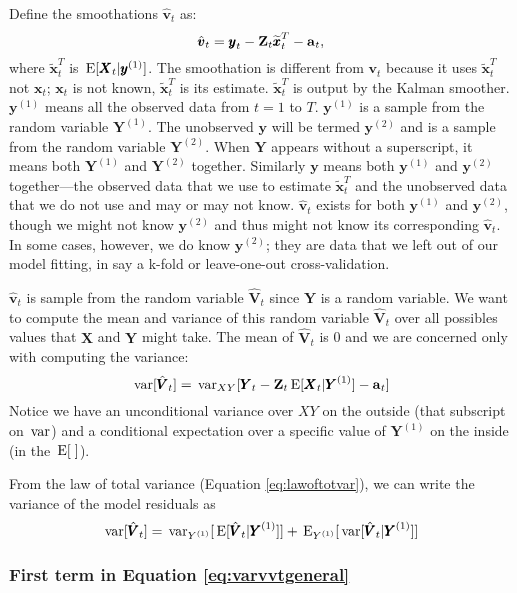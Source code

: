 \documentclass[]{article}
\def\XI{\mbox{\boldmath $\Xi$}}
\def\E{\,\textup{\textrm{E}}}
\def\VV{\mbox{$\pmb{V}$}}	\def\vv{\mbox{$\pmb{v}$}}
\def\XX{\mbox{$\pmb{X}$}}	\def\xx{\mbox{$\pmb{x}$}}
\def\YY{\mbox{$\pmb{Y}$}}	\def\yy{\mbox{$\pmb{y}$}}
\def\ZZ{\mbox{$\mathbf Z$}}	\def\zz{\mbox{$\mathbf z$}}	\def\Zb{\mbox{$\mathbf M$}} \def\Za{\mbox{$\mathbf N$}} \def\Zm{\XI}
\def\var{\,\textup{\textrm{var}}}
\def\hatxt{\widetilde{\xx}_t^T}
\begin{document}
Define the smoothations $\hat{\vv}_t$ as:
\begin{equation}\label{eq:vtT}
\hat{\vv}_t = \yy_t - \ZZ_t\hatxt - \aa_t,
\end{equation}
where  $\hatxt$ is $\E[\XX_t|\yy^{(1)}]$. The smoothation is different from $\vv_t$ because it uses $\hatxt$ not $\xx_t$; $\xx_t$ is not known, $\hatxt$ is its estimate. $\hatxt$ is output by the Kalman smoother. $\yy^{(1)}$ means all the observed data from $t=1$ to $T$. $\yy^{(1)}$ is a sample from the random variable $\YY^{(1)}$. The unobserved $\yy$ will be termed $\yy^{(2)}$ and is a sample from the random variable $\YY^{(2)}$. When $\YY$ appears without a superscript, it means both $\YY^{(1)}$ and $\YY^{(2)}$ together. Similarly $\yy$ means both $\yy^{(1)}$ and $\yy^{(2)}$ together---the observed data that we use to estimate $\hatxt$ and the unobserved data that we do not use and may or may not know. $\hat{\vv}_t$ exists for both $\yy^{(1)}$ and $\yy^{(2)}$, though we might not know $\yy^{(2)}$ and thus might not know its corresponding $\hat{\vv}_t$. In some cases, however, we do know $\yy^{(2)}$; they are data that we left out of our model fitting, in say a k-fold or leave-one-out cross-validation.

$\hat{\vv}_t$ is sample from the random variable $\hat{\VV}_t$ since $\YY$ is a random variable.  We want to compute the mean and variance of this random variable $\hat{\VV}_t$ over all possibles values that $\XX$ and $\YY$ might take. The mean of $\hat{\VV}_t$ is 0 and we are concerned only with computing the variance:
\begin{equation}\label{eq:var.vtT}
\var[\hat{\VV}_t] = \var_{XY}[\YY_t - \ZZ_t\E[\XX_t|\YY^{(1)}] - \aa_t]
\end{equation}
Notice we have an unconditional variance over $XY$ on the outside (that subscript on $\var$) and a conditional expectation over a specific value of $\YY^{(1)}$ on the inside (in the $\E[\;]$).

From the law of total variance (Equation \ref{eq:lawoftotvar}), we can write the variance of the model residuals as
\begin{equation}\label{eq:varvvtgeneral}
\var[\hat{\VV}_t] = \var_{Y^{(1)}}[\E[\hat{\VV}_t|\YY^{(1)}]] + \E_{Y^{(1)}}[\var[\hat{\VV}_t|\YY^{(1)}]]
\end{equation}

\subsubsection{First term in Equation \ref{eq:varvvtgeneral}}
\end{document}
